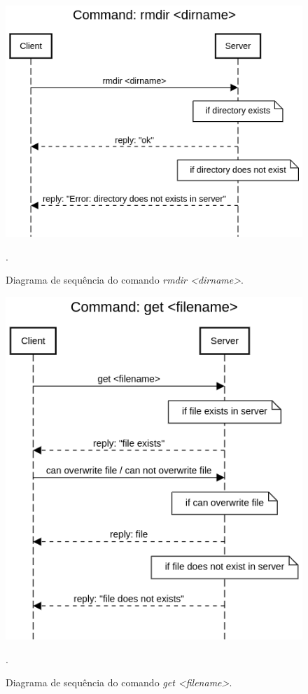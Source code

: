 \documentclass[conference]{IEEEtran}
\begin{document}
\begin{figure}[H]
\centering
\centerline{\includegraphics[scale=0.4]{diagrams/Command_rmdir_dirname.png}}
\caption{Diagrama de sequência do comando \textit{rmdir <dirname>}.}.
\label{rmdir}
\end{figure}

\begin{figure}[H]
\centering
\centerline{\includegraphics[scale=0.4]{diagrams/Command_get_filename.png}}
\caption{Diagrama de sequência do comando \textit{get <filename>}.}.
\label{get}
\end{figure}
\end{document}
